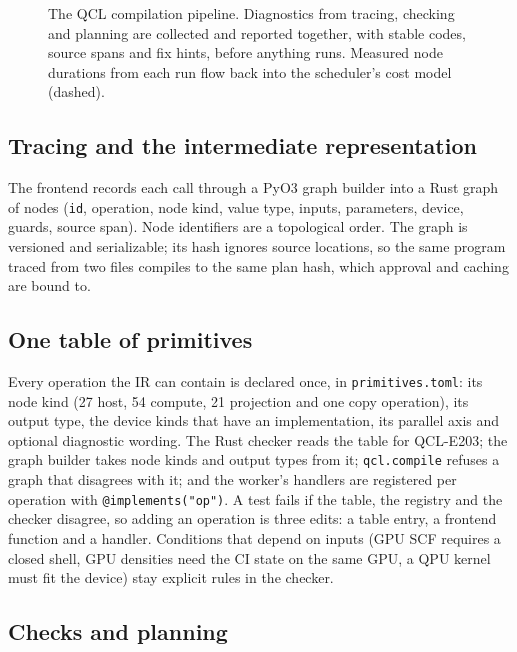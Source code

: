 \documentclass[10pt]{article}
\newcommand{\qcl}{QCL}
\newcommand{\code}[1]{\texttt{#1}}
\begin{document}
\begin{figure}[t]
\caption{The \qcl{} compilation pipeline. Diagnostics from tracing, checking and
planning are collected and reported together, with stable codes, source spans and fix
hints, before anything runs. Measured node durations from each run flow back into the
scheduler's cost model (dashed).}
\label{fig:pipeline}
\end{figure}

\subsection{Tracing and the intermediate representation}

The frontend records each call through a PyO3 graph builder into a Rust graph of nodes
(\code{id}, operation, node kind, value type, inputs, parameters, device, guards, source
span). Node identifiers are a topological order. The graph is versioned and serializable;
its hash ignores source locations, so the same program traced from two files compiles to
the same plan hash, which approval and caching are bound to.

\subsection{One table of primitives}

Every operation the IR can contain is declared once, in \code{primitives.toml}: its node
kind (27 host, 54 compute, 21 projection and one copy operation), its output type, the
device kinds that have an implementation, its parallel axis and optional diagnostic
wording. The Rust checker reads the table for QCL-E203; the graph builder takes node
kinds and output types from it; \code{qcl.compile} refuses a graph that disagrees with
it; and the worker's handlers are registered per operation with
\code{@implements("op")}. A test fails if the table, the registry and the checker
disagree, so adding an operation is three edits: a table entry, a frontend function and a
handler. Conditions that depend on inputs (GPU SCF requires a closed shell, GPU densities
need the CI state on the same GPU, a QPU kernel must fit the device) stay explicit rules
in the checker.

\subsection{Checks and planning}
\end{document}

